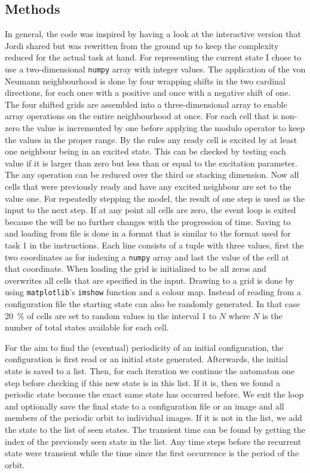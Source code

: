 \subsection{Methods}
In general, the code was inspired by having a look at the interactive version that Jordi shared but was rewritten from the ground up to keep the complexity reduced for the actual task at hand.
For representing the current state I chose to use a two-dimensional \texttt{numpy} array with integer values.
The application of the von Neumann neighbourhood is done by four wrapping shifts in the two cardinal directions, for each once with a positive and once with a negative shift of one.
The four shifted grids are assembled into a three-dimensional array to enable array operations on the entire neighbourhood at once.
For each cell that is non-zero the value is incremented by one before applying the modulo operator to keep the values in the proper range.
By the rules any ready cell is excited by at least one neighbour being in an excited state.
This can be checked by testing each value if it is larger than zero but less than or equal to the excitation parameter.
The any operation can be reduced over the third or stacking dimension.
Now all cells that were previously ready and have any excited neighbour are set to the value one.
For repeatedly stepping the model, the result of one step is used as the input to the next step.
If at any point all cells are zero, the event loop is exited because the will be no further changes with the progression of time.
Saving to and loading from file is done in a format that is similar to the format used for task 1 in the instructions.
Each line consists of a tuple with three values, first the two coordinates as for indexing a \texttt{numpy} array and last the value of the cell at that coordinate.
When loading the grid is initialized to be all zeros and overwrites all cells that are specified in the input.
Drawing to a grid is done by using \texttt{matplotlib}'s \texttt{imshow} function and a colour map.
Instead of reading from a configuration file the starting state can also be randomly generated.
In that case \SI{20}{\percent} of cells are set to random values in the interval 1 to $N$ where $N$ is the number of total states available for each cell.

For the aim to find the (eventual) periodicity of an initial configuration, the configuration is first read or an initial state generated.
Afterwards, the initial state is saved to a list.
Then, for each iteration we continue the automaton one step before checking if this new state is in this list.
If it is, then we found a periodic state because the exact same state has occurred before.
We exit the loop and optionally save the final state to a configuration file or an image and all members of the periodic orbit to individual images.
If it is not in the list, we add the state to the list of seen states.
The transient time can be found by getting the index of the previously seen state in the list.
Any time steps before the recurrent state were transient while the time since the first occurrence is the period of the orbit.

